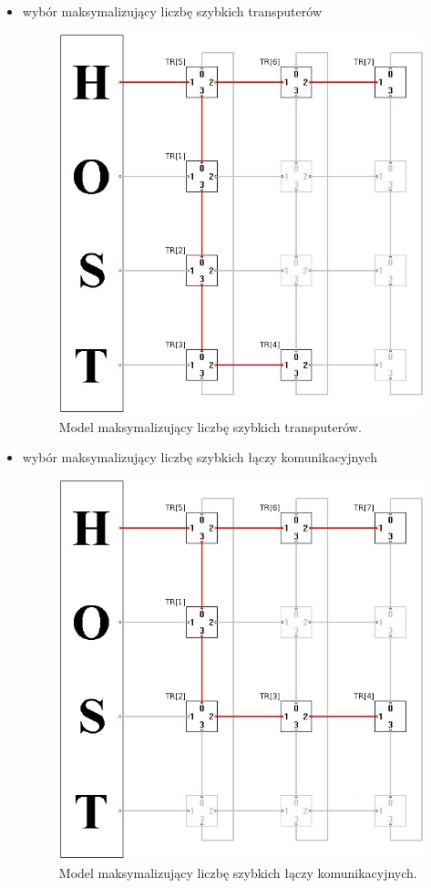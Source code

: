 \documentclass[a4paper,11pt, titlepage]{article}
\begin{document}
\begin{itemize}
\item wybór maksymalizujący liczbę szybkich transputerów
\begin{figure}[htp!]
\includegraphics[scale=0.4]{proce}
\caption{Model maksymalizujący liczbę szybkich transputerów. \label{proce}}
\end{figure} 
\item wybór maksymalizujący liczbę szybkich łączy komunikacyjnych
\begin{figure}[htp!]
\includegraphics[scale=0.4]{lacza}
\caption{Model maksymalizujący liczbę szybkich łączy komunikacyjnych. \label{lacza}}
\end{figure} 
\end{itemize}
\end{document}
